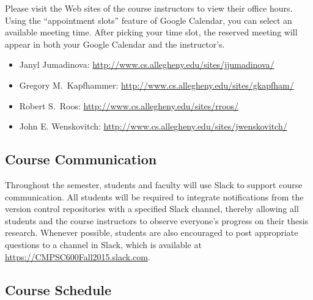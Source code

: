 Please visit the Web sites of the course instructors to view their office hours.  Using the ``appointment slots''
feature of Google Calendar, you can select an available meeting time. After picking your time slot, the reserved meeting
will appear in both your Google Calendar and the instructor's.

\vspace*{-.1in}
\begin{itemize}
    \itemsep -.25em
        \item Janyl Jumadinova: \url{http://www.cs.allegheny.edu/sites/jjumadinova/}
        \item Gregory M.\ Kapfhammer: \url{http://www.cs.allegheny.edu/sites/gkapfham/}
        \item Robert S.\ Roos: \url{http://www.cs.allegheny.edu/sites/rroos/}
        \item John E. Wenskovitch: \url{http://www.cs.allegheny.edu/sites/jwenskovitch/}
\end{itemize}

\vspace*{-.25in}
\subsection*{Course Communication}

Throughout the semester, students and faculty will use Slack to support course communication. All students will be
required to integrate notifications from the version control repositories with a specified Slack channel, thereby
allowing all students and the course instructors to observe everyone's progress on their thesis research.  Whenever
possible, students are also encouraged to post appropriate questions to a channel in Slack, which is available at
\url{https://CMPSC600Fall2015.slack.com}.

\vspace*{-.1in}
\subsection*{Course Schedule}

